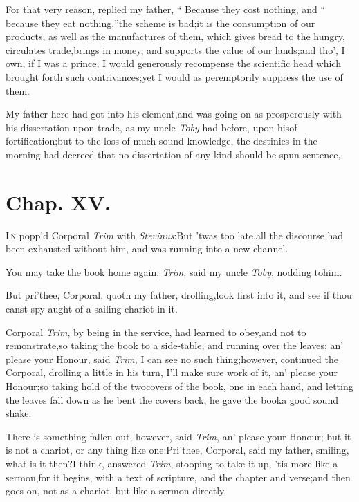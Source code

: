 \documentclass{article}
\begin{document}
\newpage
For that very reason, replied my father,
“\kern 2pt Because they cost nothing, and\break
“\kern 2pt because they eat nothing,”\tsk the scheme\break
is bad;\tsk it is the
consumption of our products, as well as the manufactures of them,
which gives bread to the hungry, circulates trade,\tsk brings in
money, and supports the value of our lands;\tsk and tho’, I
own, if I was a prince, I would
ge\-nerously recompense the scientific head which brought
forth such contrivances;\break\tsk yet I
would as peremptorily suppress the use of them.

My father here had got into his element,\tsh and was going on
as pros\-per\-ously with his dissertation upon trade, as my uncle
\textit{Toby} had before, upon his\break of fortification;\tsh but to the
loss\break
of much sound knowledge, the destinies in the morning had
decreed that no\pb
dissertation of any kind should be spun
\break sentence,

\medskip

\section{Chap. XV.}

\lettrine{I}{\,n} popp’d Corporal \textit{Trim} with
\textit{Stevinus}:\tsk But ’twas too late,\tsk all the
discourse had been exhausted without him, and was running into a
new channel.

\tsk You may take the book home again, \textit{Trim}, said my
uncle \textit{Toby}, nodding to\break him.

But pri’thee, Corporal, quoth my father, drolling,\tsk look
first into it, and see if thou canst spy aught of a
sailing\break
chariot in it.

\newpage
Corporal \textit{Trim}, by being in the service, had learned to
obey,\tsk and not to remonstrate,\tsk so taking the book to a
side-table, and running over the leaves; an’ please your
Honour, said \textit{Trim}, I can see no such thing;\tsk however,
continued the Corporal, drolling a little in his turn, I’ll
make sure work of it, an’ please your Honour;\tsk so taking
hold of the two\break covers of the book, one in each hand, and letting
the leaves fall down as he bent the covers back, he gave the
book\break a good sound shake.

There is something fallen out, however, said \textit{Trim},
an’ please your Honour; but it is not a chariot, or any
thing like one:\tsk Pri’thee, Corporal, said my father, smiling,
what is it then?\tsk I think, answered \textit{Trim}, stooping to
take it up,\tsk\break  
’tis more like a sermon,\tsk for it begins,\pb
with a text of scripture, and
the chapter and verse;\tsk and then goes on, not as a chariot,
but like a sermon directly.
\end{document}
